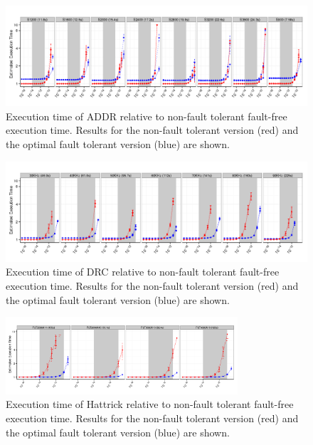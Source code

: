 \documentclass[10pt, conference, compsocconf]{IEEEtran}
\begin{document}
\begin{figure}[ht!]
\centering
\includegraphics[width=7in]{figs/Lasso_Par_Seq_EstdCost_log.png}
\vspace{-10pt}
\caption{Execution time of ADDR relative to non-fault tolerant fault-free execution time. Results for the non-fault tolerant version (red) and the optimal fault tolerant version (blue) are shown.}
\vspace{-10pt}
\label{fig:Lasso_EstdCost}
\end{figure}

\begin{figure}[ht!]
\centering
\includegraphics[width=7in]{figs/DRC_Par_Seq_EstdCost_log.png}
\vspace{-10pt}
\caption{Execution time of DRC relative to non-fault tolerant fault-free execution time. Results for the non-fault tolerant version (red) and the optimal fault tolerant version (blue) are shown.}
\vspace{-10pt}
\label{fig:DRC_EstdCost}
\end{figure}

\begin{figure}[ht!]
\centering
\includegraphics[width=3.4in]{figs/Hattrick_Par_Seq_EstdCost_log.png}
\vspace{-10pt}
\caption{Execution time of Hattrick relative to non-fault tolerant fault-free execution time. Results for the non-fault tolerant version (red) and the optimal fault tolerant version (blue) are shown.}
\vspace{-10pt}
\label{fig:Hattrick_EstdCost}
\end{figure}
\end{document}
